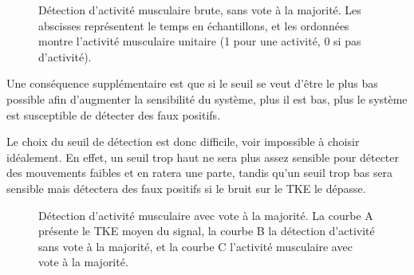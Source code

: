 \documentclass[letterpaper, twoside, 12pt, memoire, creativecommons, hyperref]{thETS}
\begin{document}
\begin{figure}
	\centering
	\caption{Détection d'activité musculaire brute, sans vote à la majorité. Les abscisses représentent le temps en échantillons, et les ordonnées montre l'activité musculaire unitaire (1 pour une activité, 0 si pas d'activité).}
	\label{fig:onsetSansVote}
\end{figure}

Une conséquence supplémentaire est que si le seuil se veut d'être le plus bas possible afin d'augmenter la sensibilité du système, plus il est bas, plus le système est susceptible de détecter des faux positifs. 

Le choix du seuil de détection est donc difficile, voir impossible à choisir idéalement. En effet, un seuil trop haut ne sera plus assez sensible pour détecter des mouvements faibles et en ratera une parte, tandis qu'un seuil trop bas sera sensible mais détectera des faux positifs si le bruit sur le TKE le dépasse.

\begin{figure}
	\centering
	\caption{Détection d'activité musculaire avec vote à la majorité. La courbe A présente le TKE moyen du signal, la courbe B la détection d'activité sans vote à la majorité, et la courbe C l'activité musculaire avec vote à la majorité.}
	\label{fig:onsetAvecVote}
\end{figure}
\end{document}
